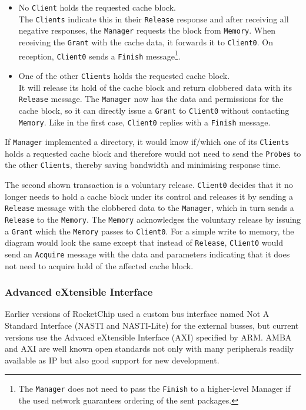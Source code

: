 \documentclass[journal,a4paper]{IEEEtran}
\makeatletter
\newcommand\footnoteref[1]{\protected@xdef\@thefnmark{\ref{#1}}\@footnotemark}
\makeatother
\begin{document}
\begin{itemize}
	\item No \texttt{Client} holds the requested cache block.\\
		The \texttt{Clients} indicate this in their \texttt{Release} response and after receiving all negative responses, the \texttt{Manager} requests the block from \texttt{Memory}.
		When receiving the \texttt{Grant} with the cache data, it forwards it to \texttt{Client0}. On reception, \texttt{Client0} sends a \texttt{Finish} message\footnote{\label{no-finish-propagation}The \texttt{Manager} does not need to pass the \texttt{Finish} to a higher-level Manager if the used network guarantees ordering of the sent packages.}.
	\item One of the other \texttt{Clients} holds the requested cache block.\\
		It will release its hold of the cache block and return clobbered data with its \texttt{Release} message.
		The \texttt{Manager} now has the data and permissions for the cache block, so it can directly issue a \texttt{Grant} to \texttt{Client0} without contacting \texttt{Memory}. Like in the first case, \texttt{Client0} replies with a \texttt{Finish} message.\footnoteref{no-finish-propagation}
\end{itemize}
If \texttt{Manager} implemented a directory, it would know if/which one of its \texttt{Clients} holds a requested cache block and therefore would not need to send the \texttt{Probes} to the other \texttt{Clients}, thereby saving bandwidth and minimising response time.

The second shown transaction is a voluntary release. \texttt{Client0} decides that it no longer needs to hold a cache block under its control and releases it by sending a \texttt{Release} message with the clobbered data to the \texttt{Manager}, which in turn sends a \texttt{Release} to the \texttt{Memory}.
The \texttt{Memory} acknowledges the voluntary release by issuing a \texttt{Grant} which the \texttt{Memory} passes to \texttt{Client0}.
For a simple write to memory, the diagram would look the same except that instead of \texttt{Release}, \texttt{Client0} would send an \texttt{Acquire} message with the data and parameters indicating that it does not need to acquire hold of the affected cache block.

\subsubsection{Advanced eXtensible Interface}
Earlier versions of RocketChip used a custom bus interface named Not A Standard Interface (NASTI and NASTI-Lite) for the external busses, but current versions use the Advaced eXtensible Interface (AXI) specified by ARM\cite{axi}.
AMBA and AXI are well known open standards not only with many peripherals readily available as IP but also good support for new development\cite{axi-tools}.
\end{document}

